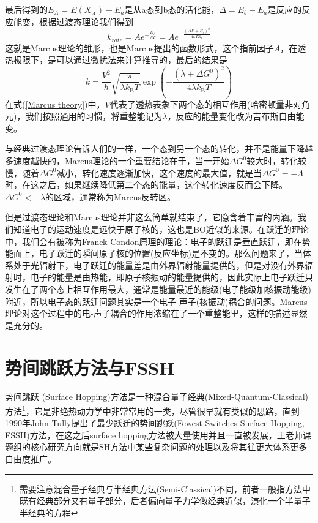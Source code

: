 \documentclass[12pt,a4paper,openany,twoside]{book}
\numberwithin{equation}{section}
\begin{document}
        最后得到的$E_A=E\left(X_{\mathrm{tr}}\right)-E_a$是从a态到b态的活化能，$\Delta = E_b-E_a$是反应的反应能变，根据过渡态理论我们得到
        \begin{equation*}
          k_{r a t e}=A e^{-\frac{E_{A}}{k T}}=A e^{-\frac{\left(\Delta E+E_{r}\right)^{2}}{4 k T E_{r}}}
        \end{equation*}
        这就是Marcus理论的雏形，也是Marcus提出的函数形式，这个指前因子$A$，在透热极限下，是可以通过微扰法来计算推导的，最后的结果是
        \begin{equation}
          k=\frac{V^{2}}{\hbar} \sqrt{\frac{\pi}{\lambda k_{\mathrm{B}} T}} \exp \left(-\frac{\left(\lambda+\Delta G^{0}\right)^{2}}{4 \lambda k_{\mathrm{B}} T}\right)
          \label{Marcus theory}
        \end{equation}
        在式(\ref{Marcus theory})中，$V$代表了透热表象下两个态的相互作用(哈密顿量非对角元)，我们按照通用的习惯，将重整能记为$\lambda$，反应的能量变化改为吉布斯自由能变。

        与经典过渡态理论告诉人们的一样，一个态到另一个态的转化，并不是能量下降越多速度越快的，Marcus理论的一个重要结论在于，当一开始$\Delta G^{0}$较大时，转化较慢，随着$\Delta G^{0}$减小，转化速度逐渐加快，这个速度的最大值，就是当$\Delta G^{0} = -\Lambda$时，在这之后，如果继续降低第二个态的能量，这个转化速度反而会下降。$\Delta G^{0}< -\lambda$的区域，通常称为Marcus反转区。

        但是过渡态理论和Marcus理论并非这么简单就结束了，它隐含着丰富的内涵。我们知道电子的运动速度是远快于原子核的，这也是BO近似的来源。在跃迁的理论中，我们会有被称为Franck-Condon原理的理论：电子的跃迁是垂直跃迁，即在势能面上，电子跃迁的瞬间原子核的位置(反应坐标)是不变的。那么问题来了，当体系处于光辐射下，电子跃迁的能量差是由外界辐射能量提供的，但是对没有外界辐射时，电子的能量是由热能，即原子核振动的能量提供的，因此实际上电子跃迁只发生在了两个态上相互作用最大，通常是能量最近的能级(电子能级加核振动能级)附近，所以电子态的跃迁问题其实是一个电子-声子(核振动)耦合的问题。Marcus理论对这个过程中的电-声子耦合的作用浓缩在了一个重整能里，这样的描述显然是充分的。

      \section{势间跳跃方法与FSSH}
        势间跳跃 (Surface Hopping)方法是一种混合量子经典(Mixed-Quantum-Classical)方法\footnote{需要注意混合量子经典与半经典方法(Semi-Classical)不同，前者一般指方法中既有经典部分又有量子部分，后者偏向量子力学做经典近似，演化一个半量子半经典的方程}，它是非绝热动力学中非常常用的一类，尽管很早就有类似的思路，直到1990年John Tully提出了最少跃迁的势间跳跃(Fewest Switches Surface Hopping, FSSH)方法\cite{Tully1990}，在这之后surface hopping方法被大量使用并且一直被发展，王老师课题组的核心研究方向就是SH方法中某些复杂问题的处理以及将其往更大体系更多自由度推广。
\end{document}
